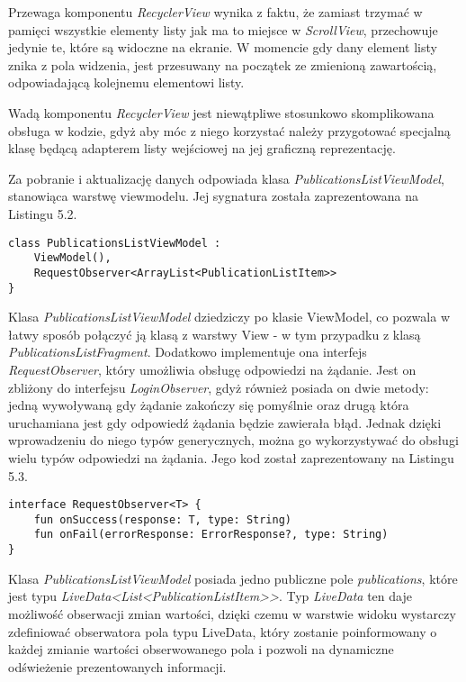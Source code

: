\documentclass[a4paper,12pt,twoside,openany]{report}
\begin{document}
Przewaga komponentu \textit{RecyclerView} wynika z faktu, że zamiast trzymać w pamięci wszystkie elementy listy jak ma to miejsce w \textit{ScrollView}, przechowuje jedynie te, które są widoczne na ekranie. W momencie gdy dany element listy znika z pola widzenia, jest przesuwany na początek ze zmienioną zawartością, odpowiadającą kolejnemu elementowi listy. 

Wadą komponentu \textit{RecyclerView} jest niewątpliwe stosunkowo skomplikowana obsługa w kodzie, gdyż aby móc z niego korzystać należy przygotować specjalną klasę będącą adapterem listy wejściowej na jej graficzną reprezentację.

Za pobranie i aktualizację danych odpowiada klasa  \textit{PublicationsListViewModel}, stanowiąca warstwę viewmodelu.
Jej sygnatura została zaprezentowana na Listingu 5.2.

 \begin{lstlisting}[caption=Sygnatura klasy PublicationsListViewModel,label=code1,captionpos=b]
class PublicationsListViewModel : 
	ViewModel(),
	RequestObserver<ArrayList<PublicationListItem>>   
}
\end{lstlisting} 
Klasa \textit{PublicationsListViewModel} dziedziczy po klasie ViewModel, co pozwala w łatwy sposób połączyć ją klasą z warstwy View - w tym przypadku z klasą \textit{PublicationsListFragment}. Dodatkowo implementuje ona interfejs \textit{RequestObserver}, który umożliwia obsługę odpowiedzi na żądanie. Jest on zbliżony do interfejsu \textit{LoginObserver}, gdyż również posiada on dwie metody: jedną wywoływaną gdy żądanie zakończy się pomyślnie oraz drugą która uruchamiana jest gdy odpowiedź żądania będzie zawierała błąd. Jednak dzięki wprowadzeniu do niego typów generycznych, można go wykorzystywać do obsługi wielu typów odpowiedzi na żądania. Jego kod został zaprezentowany na Listingu 5.3.

 \begin{lstlisting}[caption=Interfejs RequestObserver,label=code1,captionpos=b]
interface RequestObserver<T> {
	fun onSuccess(response: T, type: String)
	fun onFail(errorResponse: ErrorResponse?, type: String)
}
\end{lstlisting} 
 Klasa \textit{PublicationsListViewModel} posiada jedno publiczne pole \textit{publications}, które jest typu \textit{LiveData<List<PublicationListItem>>}. Typ \textit{LiveData} ten daje możliwość obserwacji zmian wartości, dzięki czemu w warstwie widoku wystarczy zdefiniować obserwatora pola typu LiveData, który zostanie poinformowany o każdej zmianie wartości obserwowanego pola i pozwoli na dynamiczne odświeżenie prezentowanych informacji. 
 
\end{document}
